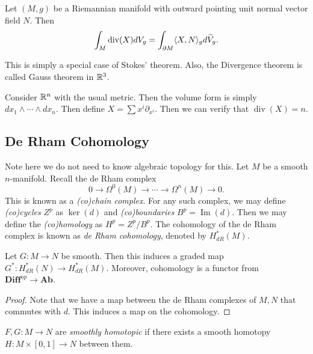 \documentclass[twoside, 10pt]{article}
\begin{document}
    \begin{thm}
        Let $(M,g)$ be a Riemannian manifold with outward pointing unit normal vector field $N$. Then 
        \[ \int_M \operatorname{div}(X) dV_g = \int_{\partial M} \langle X,N\rangle_g d\widetilde{V}_g.\]
    \end{thm}

    This is simply a special case of Stokes' theorem. Also, the Divergence theorem is called Gauss theorem in $\mathbb{R}^3$.

    \begin{exm}
        Consider $\mathbb{R}^n$ with the usual metric. Then the volume form is simply $dx_1 \wedge \cdots \wedge dx_n$. Then define $X = \sum x^i \partial_{x^i}$. Then we can verify that $\operatorname{div}(X) = n$.
    \end{exm}

    \subsection{De Rham Cohomology}%
    \label{sub:de_rham_cohomology}
    
    Note here we do not need to know algebraic topology for this. Let $M$ be a smooth $n$-manifold. Recall the de Rham complex 
    \[ 0 \to \Omega^0(M) \to \cdots \to \Omega^n(M) \to 0.\]
    This is known as a \textit{(co)chain complex}. For any such complex, we may define \textit{(co)cycles} $Z^p$ as $\ker(d)$ and \textit{(co)boundaries} $B^p = \operatorname{Im}(d)$. Then we may define the \textit{(co)homology} as $H^p = Z^p/B^p$. The cohomology of the de Rham complex is known as \textit{de Rham cohomology}, denoted by $H^*_{dR}(M)$.

    \begin{prop}
        Let $G:M \to N$ be smooth. Then this induces a graded map $G^*: H^*_{dR}(N) \to H^*_{dR}(M)$. Moreover, cohomology is a functor from $\mathbf{Diff}^{op} \to \mathbf{Ab}$.
    \end{prop}

    \begin{proof}
         Note that we have a map between the de Rham complexes of $M, N$ that commutes with $d$. This induces a map on the cohomology.
    \end{proof}

    \begin{defn}
        $F,G:M \to N$ are \textit{smoothly homotopic} if there exists a smooth homotopy $H:M \times [0,1] \to N$ between them.
    \end{defn}
\end{document}
